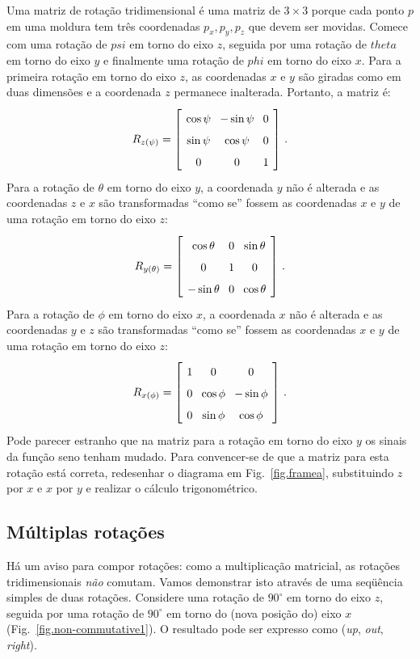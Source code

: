 Uma matriz de rotação tridimensional é uma matriz de $3\times 3$ porque cada ponto $p$ em uma moldura tem três coordenadas $p_x,p_y,p_z$ que devem ser movidas. 
Comece com uma rotação de $psi$ em torno do eixo $z$, seguida por uma rotação de $theta$ em torno do eixo $y$ e finalmente uma rotação de $phi$ em torno do eixo $x$. Para a primeira rotação em torno do eixo $z$, as coordenadas $x$ e $y$ são giradas como em duas dimensões e a coordenada $z$ permanece inalterada. Portanto, a matriz é:
\[
\spacearray
R_{z(\psi)}=\left[\begin{array}{ccc}\cos\psi&-\sin\psi&0\\\sin\psi&\cos\psi&0\\0&0&1\end{array}\right]\,.
\]
Para a rotação de $\theta$ em torno do eixo $y$, a coordenada $y$ não é alterada e as coordenadas $z$ e $x$ são transformadas ``como se'' fossem as coordenadas $x$ e $y$ de uma rotação em torno do eixo $z$:
\[
\spacearray
R_{y(\theta)}=\left[\begin{array}{ccc}\cos\theta&0&\sin\theta\\0&1&0\\-\sin\theta&0&\cos\theta\\\end{array}\right]\,.
\]
Para a rotação de $\phi$ em torno do eixo $x$, a coordenada $x$ não é alterada e as coordenadas $y$ e $z$ são transformadas ``como se'' fossem as coordenadas $x$ e $y$ de uma rotação em torno do eixo $z$:
\[
\spacearray
R_{x(\phi)}=\left[\begin{array}{ccc}1&0&0\\0&\cos\phi&-\sin\phi\\0&\sin\phi&\cos\phi\\\end{array}\right]\,.
\]
Pode parecer estranho que na matriz para a rotação em torno do eixo $y$ os sinais da função seno tenham mudado. Para convencer-se de que a matriz para esta rotação está correta, redesenhar o diagrama em Fig.~\ref{fig.framea}, substituindo $z$ por $x$ e $x$ por $y$ e realizar o cálculo trigonométrico.

\subsection{Múltiplas rotações}

Há um aviso para compor rotações: como a multiplicação matricial, as rotações tridimensionais \emph{não} comutam. Vamos demonstrar isto através de uma seqüência simples de duas rotações. Considere uma rotação de $90^\circ$ em torno do eixo $z$, seguida por uma rotação de $90^\circ$ em torno do (nova posição do) eixo $x$ (Fig.~\ref{fig.non-commutative1}). O resultado pode ser expresso como (\textit{up}, \textit{out}, \textit{right}).

